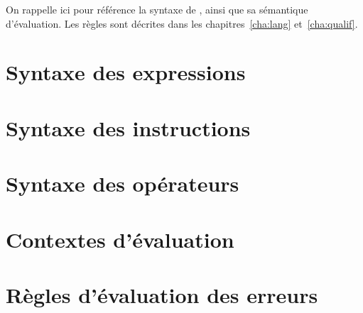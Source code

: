 On rappelle ici pour référence la syntaxe de \langname, ainsi que sa sémantique
d'évaluation. Les règles sont décrites dans les chapitres~\ref{cha:lang}
et~\ref{cha:qualif}.

\section*{Syntaxe des expressions}
\vspace{-1em}

\setlength{\FrameSep}{3pt}

\begin{framed}
\figstxdata{}
\end{framed}

\section*{Syntaxe des instructions}

\begin{framed}
\figstxinstr{}
\end{framed}

\section*{Syntaxe des opérateurs}

\begin{framed}
\figstxops{}
\end{framed}

\section*{Contextes d'évaluation}

\begin{framed}
    \figctx{}
\end{framed}

\section*{Règles d'évaluation des erreurs}

\begin{framed}
\begin{mathpar}




\end{mathpar}

\end{framed}

